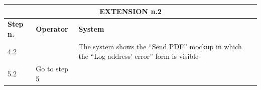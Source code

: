 {{{\begin{center}
			\begin{tabular}{|p{2cm}|p{6cm}|p{6cm}|}
			\hline
				\multicolumn{3}{|c|}{EXTENSION n.2}\\
			\hline
				\centering \vspace{1mm} \bfseries{Step n.} \vspace{1mm} & \vspace{1mm} \bfseries{Operator} \vspace{1mm} & \vspace{1mm} \bfseries{System} \vspace{1mm}\\
			\hline
				\vspace{1mm} 4.2 \vspace{1mm} &
				\vspace{1mm} \vspace{1mm} & 
				\vspace{1mm} The system shows the “Send PDF” mockup in which the “Log address’ error” form is visible  \vspace{1mm} \\
			\hline
				\vspace{1mm} 5.2\vspace{1mm} &
				\vspace{1mm} Go to step 5\vspace{1mm} & 
				\vspace{1mm} \vspace{1mm} \\
			\hline
			\end{tabular}


\end{center}}}}
